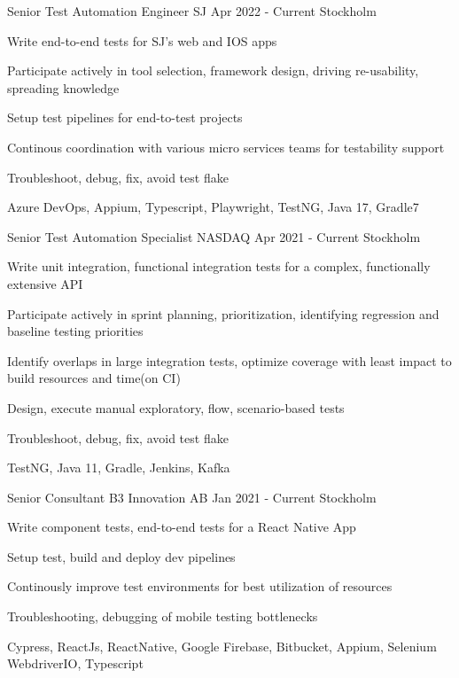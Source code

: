 \documentclass[11pt, a4paper]{awesome-cv}
\begin{document}
  \begin{cventries}

    \cventry
    {Senior Test Automation Engineer}
    {SJ}
    {Apr 2022 - Current}
    {Stockholm}
    {
      \begin{cvitems}
        \item Write end-to-end tests for SJ's web and IOS apps 
        \item Participate actively in tool selection, framework design, driving re-usability, spreading knowledge
        \item Setup test pipelines for end-to-test projects
        \item Continous coordination with various micro services teams for testability support
        \item Troubleshoot, debug, fix, avoid test flake
        \item Azure DevOps, Appium, Typescript, Playwright, TestNG, Java 17, Gradle7
      \end{cvitems}
    }

    \cventry
    {Senior Test Automation Specialist}
    {NASDAQ}
    {Apr 2021 - Current}
    {Stockholm}
    {
      \begin{cvitems}
        \item Write unit integration, functional integration tests for a complex, functionally extensive API 
        \item Participate actively in sprint planning, prioritization, identifying regression and baseline testing priorities
        \item Identify overlaps in large integration tests, optimize coverage with least impact to build resources and time(on CI)
        \item Design, execute manual exploratory, flow, scenario-based tests
        \item Troubleshoot, debug, fix, avoid test flake
        \item TestNG, Java 11, Gradle, Jenkins, Kafka
      \end{cvitems}
    }

    \cventry
    {Senior Consultant}
    {B3 Innovation AB}
    {Jan 2021 - Current}
    {Stockholm}
    {
      \begin{cvitems}
        \item Write component tests, end-to-end tests for a React Native App 
        \item Setup test, build and deploy dev pipelines
        \item Continously improve test environments for best utilization of resources
        \item Troubleshooting, debugging of mobile testing bottlenecks
        \item Cypress, ReactJs, ReactNative, Google Firebase, Bitbucket, Appium, Selenium WebdriverIO, Typescript
      \end{cvitems}
    }


\end{cventries}
\end{document}
